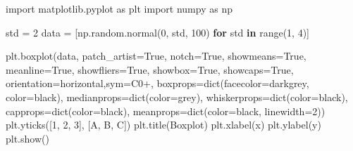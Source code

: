 \documentclass[
  letterpaper,
  DIV=11,
  numbers=noendperiod]{scrreprt}
\newenvironment{Shaded}{\begin{snugshade}}{\end{snugshade}}
\newcommand{\BuiltInTok}[1]{\textcolor[rgb]{0.00,0.23,0.31}{#1}}
\newcommand{\ControlFlowTok}[1]{\textcolor[rgb]{0.00,0.23,0.31}{\textbf{#1}}}
\newcommand{\DecValTok}[1]{\textcolor[rgb]{0.68,0.00,0.00}{#1}}
\newcommand{\ImportTok}[1]{\textcolor[rgb]{0.00,0.46,0.62}{#1}}
\newcommand{\KeywordTok}[1]{\textcolor[rgb]{0.00,0.23,0.31}{\textbf{#1}}}
\newcommand{\NormalTok}[1]{\textcolor[rgb]{0.00,0.23,0.31}{#1}}
\newcommand{\OperatorTok}[1]{\textcolor[rgb]{0.37,0.37,0.37}{#1}}
\newcommand{\StringTok}[1]{\textcolor[rgb]{0.13,0.47,0.30}{#1}}
\newcommand{\VariableTok}[1]{\textcolor[rgb]{0.07,0.07,0.07}{#1}}
\begin{document}
\begin{Shaded}
\begin{Highlighting}[]
\ImportTok{import}\NormalTok{ matplotlib.pyplot }\ImportTok{as}\NormalTok{ plt}
\ImportTok{import}\NormalTok{ numpy }\ImportTok{as}\NormalTok{ np}

\NormalTok{std }\OperatorTok{=} \DecValTok{2}
\NormalTok{data }\OperatorTok{=}\NormalTok{ [np.random.normal(}\DecValTok{0}\NormalTok{, std, }\DecValTok{100}\NormalTok{) }\ControlFlowTok{for}\NormalTok{ std }\KeywordTok{in} \BuiltInTok{range}\NormalTok{(}\DecValTok{1}\NormalTok{, }\DecValTok{4}\NormalTok{)]}


\NormalTok{plt.boxplot(data, patch\_artist}\OperatorTok{=}\VariableTok{True}\NormalTok{, notch}\OperatorTok{=}\VariableTok{True}\NormalTok{, showmeans}\OperatorTok{=}\VariableTok{True}\NormalTok{, meanline}\OperatorTok{=}\VariableTok{True}\NormalTok{, showfliers}\OperatorTok{=}\VariableTok{True}\NormalTok{, showbox}\OperatorTok{=}\VariableTok{True}\NormalTok{, showcaps}\OperatorTok{=}\VariableTok{True}\NormalTok{, orientation}\OperatorTok{=}\StringTok{\textquotesingle{}horizontal\textquotesingle{}}\NormalTok{,sym}\OperatorTok{=}\StringTok{\textquotesingle{}C0+\textquotesingle{}}\NormalTok{,}
\NormalTok{            boxprops}\OperatorTok{=}\BuiltInTok{dict}\NormalTok{(facecolor}\OperatorTok{=}\StringTok{\textquotesingle{}darkgrey\textquotesingle{}}\NormalTok{, color}\OperatorTok{=}\StringTok{\textquotesingle{}black\textquotesingle{}}\NormalTok{),}
\NormalTok{            medianprops}\OperatorTok{=}\BuiltInTok{dict}\NormalTok{(color}\OperatorTok{=}\StringTok{\textquotesingle{}grey\textquotesingle{}}\NormalTok{),}
\NormalTok{            whiskerprops}\OperatorTok{=}\BuiltInTok{dict}\NormalTok{(color}\OperatorTok{=}\StringTok{\textquotesingle{}black\textquotesingle{}}\NormalTok{),}
\NormalTok{            capprops}\OperatorTok{=}\BuiltInTok{dict}\NormalTok{(color}\OperatorTok{=}\StringTok{\textquotesingle{}black\textquotesingle{}}\NormalTok{),}
\NormalTok{            meanprops}\OperatorTok{=}\BuiltInTok{dict}\NormalTok{(color}\OperatorTok{=}\StringTok{\textquotesingle{}black\textquotesingle{}}\NormalTok{, linewidth}\OperatorTok{=}\DecValTok{2}\NormalTok{))}
\NormalTok{plt.yticks([}\DecValTok{1}\NormalTok{, }\DecValTok{2}\NormalTok{, }\DecValTok{3}\NormalTok{], [}\StringTok{\textquotesingle{}A\textquotesingle{}}\NormalTok{, }\StringTok{\textquotesingle{}B\textquotesingle{}}\NormalTok{, }\StringTok{\textquotesingle{}C\textquotesingle{}}\NormalTok{])}
\NormalTok{plt.title(}\StringTok{\textquotesingle{}Boxplot\textquotesingle{}}\NormalTok{)}
\NormalTok{plt.xlabel(}\StringTok{\textquotesingle{}x\textquotesingle{}}\NormalTok{)}
\NormalTok{plt.ylabel(}\StringTok{\textquotesingle{}y\textquotesingle{}}\NormalTok{)}
\NormalTok{plt.show()}
\end{Highlighting}
\end{Shaded}
\end{document}
